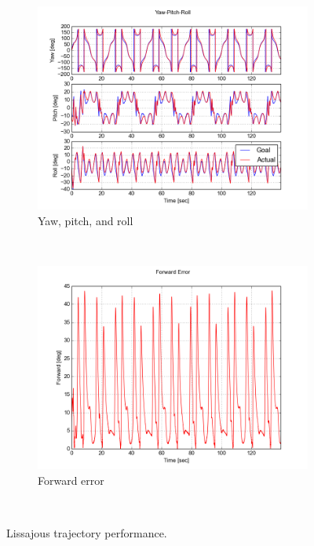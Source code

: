 \documentclass[paper=letter, fontsize=11pt]{scrartcl} %
\numberwithin{equation}{section} %
\numberwithin{figure}{section} %
\numberwithin{table}{section} %
\begin{document}
\begin{figure}[h]
  \begin{subfigure}[b]{0.45\textwidth}
    \includegraphics[width=\textwidth]{lissajous_yaw_pitch_roll}
    \caption{Yaw, pitch, and roll}
    \label{fig:lissajous_yaw_pitch_roll}
  \end{subfigure}%
  ~ %
  \begin{subfigure}[b]{0.45\textwidth}
    \includegraphics[width=\textwidth]{lissajous_fwd_error}
    \caption{Forward error}
    \label{fig:lissajous_fwd_error}
  \end{subfigure}
  ~ %
  \caption{Lissajous trajectory performance.}
  \label{fig:lissajous_performance}
\end{figure}
\end{document}
